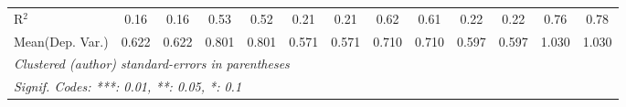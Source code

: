 \begin{tabular}{lcccccccccccc}
   R$^2$                                    & 0.16          & 0.16           & 0.53         & 0.52        & 0.21          & 0.21          & 0.62          & 0.61    & 0.22          & 0.22          & 0.76    & 0.78\\  
Mean(Dep. Var.) & 0.622 & 0.622 & 0.801 & 0.801 & 0.571 & 0.571 & 0.710 & 0.710 & 0.597 & 0.597 & 1.030 & 1.030 \\
   \midrule \midrule
   \multicolumn{13}{l}{\emph{Clustered (author) standard-errors in parentheses}}\\
   \multicolumn{13}{l}{\emph{Signif. Codes: ***: 0.01, **: 0.05, *: 0.1}}\\
\end{tabular}
\par\endgroup
